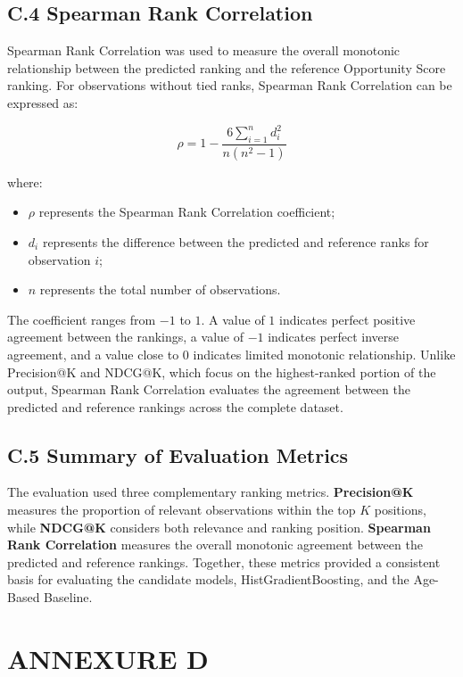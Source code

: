 \documentclass[12pt,a4paper]{report}
\begin{document}
\section*{C.4 Spearman Rank Correlation}

Spearman Rank Correlation was used to measure the overall monotonic relationship between the predicted ranking and the reference Opportunity Score ranking. For observations without tied ranks, Spearman Rank Correlation can be expressed as:

\begin{equation}
\rho
=
1-
\frac{6\sum_{i=1}^{n}d_i^2}
{n(n^2-1)}
\end{equation}

where:

\begin{itemize}
    \item $\rho$ represents the Spearman Rank Correlation coefficient;
    \item $d_i$ represents the difference between the predicted and reference ranks for observation $i$;
    \item $n$ represents the total number of observations.
\end{itemize}

The coefficient ranges from $-1$ to $1$. A value of $1$ indicates perfect positive agreement between the rankings, a value of $-1$ indicates perfect inverse agreement, and a value close to $0$ indicates limited monotonic relationship. Unlike Precision@K and NDCG@K, which focus on the highest-ranked portion of the output, Spearman Rank Correlation evaluates the agreement between the predicted and reference rankings across the complete dataset.

\section*{C.5 Summary of Evaluation Metrics}
The evaluation used three complementary ranking metrics. \textbf{Precision@K} measures the proportion of relevant observations within the top $K$ positions, while \textbf{NDCG@K} considers both relevance and ranking position. \textbf{Spearman Rank Correlation} measures the overall monotonic agreement between the predicted and reference rankings. Together, these metrics provided a consistent basis for evaluating the candidate models, HistGradientBoosting, and the Age-Based Baseline.


\chapter*{ANNEXURE D}
\end{document}
